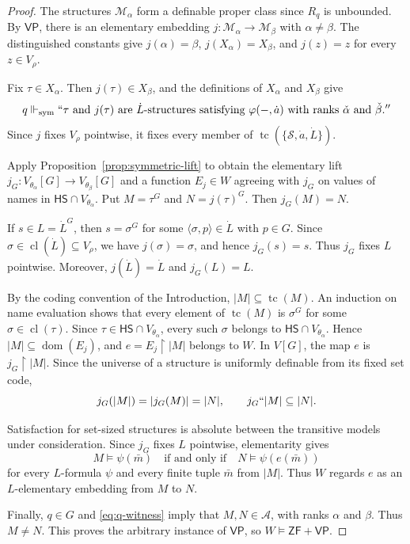\documentclass[10pt,a4paper]{amsart}
\newcommand{\HS}{\mathsf{HS}}
\newcommand{\VP}{\mathsf{VP}}
\newcommand{\ZF}{\mathsf{ZF}}
\newcommand{\forcesS}{\Vdash_{\mathrm{sym}}}
\newcommand{\restr}{\mathbin{\upharpoonright}}
\newcommand{\tc}{\operatorname{tc}}
\begin{document}
\begin{proof}
The structures $\mathcal M_\alpha$ form a definable proper class since $R_q$ is unbounded.  By $\VP$, there is an elementary embedding $j:\mathcal M_\alpha\to\mathcal M_\beta$ with $\alpha\ne\beta$.  The distinguished constants give $j(\alpha)=\beta$, $j(X_\alpha)=X_\beta$, and $j(z)=z$ for every $z\in V_\rho$.

Fix $\tau\in X_\alpha$.  Then $j(\tau)\in X_\beta$, and the definitions of $X_\alpha$ and $X_\beta$ give
\begin{equation}\label{eq:q-witness}
q\forcesS ``\tau\text{ and }j(\tau)\text{ are }\dot L\text{-structures satisfying }
\varphi(-,\dot a)\text{ with ranks }\check\alpha\text{ and }\check\beta.''
\end{equation}
Since $j$ fixes $V_\rho$ pointwise, it fixes every member of $\tc(\{\mathscr S,\dot a,\dot L\})$.

Apply Proposition~\ref{prop:symmetric-lift} to obtain the elementary lift
$j_G:V_{\theta_\alpha}[G]\to V_{\theta_\beta}[G]$ and a function $E_j\in W$ agreeing with $j_G$ on values of names in $\HS\cap V_{\theta_\alpha}$.  Put $M=\tau^G$ and $N=j(\tau)^G$.  Then $j_G(M)=N$.

If $s\in L=\dot L^G$, then $s=\sigma^G$ for some $\langle\sigma,p\rangle\in\dot L$ with $p\in G$.  Since $\sigma\in\operatorname{cl}(\dot L)\subseteq V_\rho$, we have $j(\sigma)=\sigma$, and hence $j_G(s)=s$.  Thus $j_G$ fixes $L$ pointwise.  Moreover, $j(\dot L)=\dot L$ and $j_G(L)=L$.

By the coding convention of the Introduction, $\lvert M\rvert\subseteq\tc(M)$.  An induction on name evaluation shows that every element of $\tc(M)$ is $\sigma^G$ for some $\sigma\in\operatorname{cl}(\tau)$.  Since $\tau\in\HS\cap V_{\theta_\alpha}$, every such $\sigma$ belongs to $\HS\cap V_{\theta_\alpha}$.  Hence $|M|\subseteq\operatorname{dom}(E_j)$, and $e=E_j\restr|M|$ belongs to $W$.  In $V[G]$, the map $e$ is $j_G\restr|M|$.  Since the universe of a structure is uniformly definable from its fixed set code,
\[
j_G(|M|)=|j_G(M)|=|N|,
\qquad j_G``|M|\subseteq|N|.
\]

{Satisfaction for set-sized structures is absolute between the transitive models under consideration.  Since $j_G$ fixes $L$ pointwise, elementarity gives}
\[
M\models\psi(\bar m)\quad\text{if and only if}\quad
N\models\psi(e(\bar m))
\]
{for every $L$-formula $\psi$ and every finite tuple $\bar m$ from $|M|$.  Thus $W$ regards $e$ as an $L$-elementary embedding from $M$ to $N$.}

Finally, $q\in G$ and \eqref{eq:q-witness} imply that $M,N\in\mathcal A$, with ranks $\alpha$ and $\beta$.  Thus $M\neq N$.  This proves the arbitrary instance of $\VP$, so $W\models\ZF+\VP$.
\end{proof}
\end{document}
